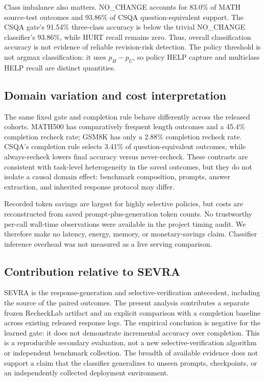 \documentclass[conference]{IEEEtran}
\begin{document}
Class imbalance also matters. NO\_CHANGE accounts for 83.0\% of MATH source-test outcomes and 93.86\% of CSQA question-equivalent support. The CSQA gate's 91.54\% three-class accuracy is below the trivial NO\_CHANGE classifier's 93.86\%, while HURT recall remains zero. Thus, overall classification accuracy is not evidence of reliable revision-risk detection. The policy threshold is not argmax classification: it uses $p_H-p_U$, so policy HELP capture and multiclass HELP recall are distinct quantities.

\subsection{Domain variation and cost interpretation}
The same fixed gate and completion rule behave differently across the released cohorts. MATH500 has comparatively frequent length outcomes and a 45.4\% completion recheck rate; GSM8K has only a 2.88\% completion recheck rate. CSQA's completion rule selects 3.41\% of question-equivalent outcomes, while always-recheck lowers final accuracy versus never-recheck. These contrasts are consistent with task-level heterogeneity in the saved outcomes, but they do not isolate a causal domain effect: benchmark composition, prompts, answer extraction, and inherited response protocol may differ.

Recorded token savings are largest for highly selective policies, but costs are reconstructed from saved prompt-plus-generation token counts. No trustworthy per-call wall-time observations were available in the project timing audit. We therefore make no latency, energy, memory, or monetary-savings claim. Classifier inference overhead was not measured as a live serving comparison.

\subsection{Contribution relative to SEVRA}
SEVRA is the response-generation and selective-verification antecedent, including the source of the paired outcomes. The present analysis contributes a separate frozen RecheckLab artifact and an explicit comparison with a completion baseline across existing released response logs. The empirical conclusion is negative for the learned gate: it does not demonstrate incremental accuracy over completion. This is a reproducible secondary evaluation, not a new selective-verification algorithm or independent benchmark collection. The breadth of available evidence does not support a claim that the classifier generalizes to unseen prompts, checkpoints, or an independently collected deployment environment.
\end{document}
